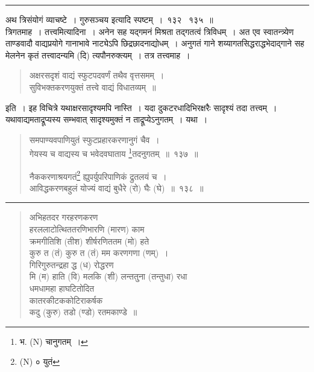 \documentclass[11pt, openany]{book}
\begin{document}
\hrule

\vspace{2mm}
अथ त्रिसंयोगं व्याचष्टे~। गुरुसञ्चय इत्यादि स्पष्टम्~।~१३२ \textendash\ १३५~॥\\

{\qtt त्रिगतमाह}~। तत्त्वमित्यादिना~। अनेन सह यद्गमनं मिश्रता तद्गतत्वं त्रिविधम्~। अत एव स्वातन्त्र्येण ताण्डवादौ वाद्यप्रयोगे गानाभावे नाट्येऽपि छिद्रछादनाद्योधम्~। अनुगतं गाने शय्यागतसिद्धराद्धभेदाद्गाने सह मेलनेन कृतं तत्त्वादन्यमि (दि) त्यपौनरुक्त्यम्~। तत्र तत्त्वमाह~।

\begin{quote}
{\qt अक्षरसदृशं वाद्यं स्फुटपदवर्णं तथैव वृत्तसमम्~।\\
 सुविभक्तकरणयुक्तं तत्त्वे वाद्यं विधातव्यम्~॥}
\end{quote}

\noindent
इति~। इह विचित्रे यथाक्षरसादृश्यमपि नास्ति~। यदा दुकटरधादिभिरक्षरैः सादृश्यं तदा तत्त्वम्~। यथावाद्यमताद्रूप्यस्य सम्भवात् सादृश्यमुक्तं न ताद्रूप्येऽनुगतम्~। यथा~।

\newpage

\begin{quote}
{\na समपाण्यवपाणियुतं स्फुटप्रहारकरणानुगं चैव~।\\
गेयस्य च वाद्यस्य च भवेदवघाताय \renewcommand{\thefootnote}{1}\footnote{भ. (N) चानुगतम्~।}तदनुगतम्~॥~१३७~॥

नैककरणाश्रयगतं\renewcommand{\thefootnote}{2}\footnote{(N) ० युतं} ह्युपर्युपरिपाणिकं द्रुतलयं च~।\\
आविद्धकरणबहुलं योज्यं वाद्यं बुधैरे (रो) घैः (घे)~॥~१३८~॥}
\end{quote}

\hrule

\begin{quote}
{\qt  अभिहतदर गरहरणकरण\\
 हरललाटोत्थिततरणिभारणि (मारण) काम\\
 क्रमगीतिशि (तीश) शीर्षरणिततम (मो) हते\\
 कुरु त (तं) कुरु त (तं) मम करणगणा (णम्)~।\\
 गिरिगुरुतन्द्रहा द्ध (ध) रोद्धरण\textendash \\
 मि (म) हाति (वि) मलकि (शी) लन्ततु्ना (तन्तुधा) रधा\textendash \\
 धमधामहा हाघटितोदित\textendash \\
 कातरकीटककोटिराकर्षक\\
 कदु (कुरु) तडो (ण्डो) रतमकाण्डे~॥}
\end{quote}
\end{document}
